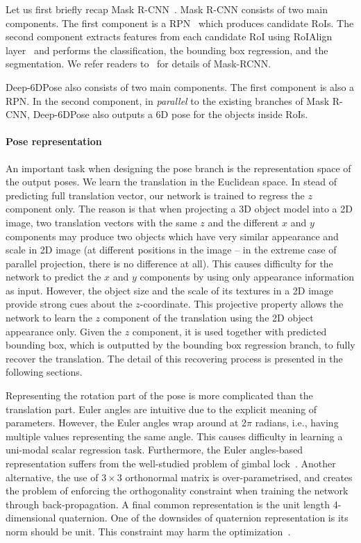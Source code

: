 \documentclass[conference]{IEEEtran}
\newcommand{\method}[1]{Deep-6DPose}
\begin{document}
Let us first briefly recap Mask R-CNN~\cite{Mask-RCNN}. Mask R-CNN consists of two main components. The first component is a RPN~\cite{Faster-RCNN} which produces candidate RoIs. The second component extracts features from each candidate RoI using RoIAlign layer~\cite{Mask-RCNN} and performs the classification, the bounding box regression, and the segmentation. We refer readers to~\cite{Mask-RCNN} for details of Mask-RCNN. 

\method{} also consists of two main components. The first component is also a RPN. In the second component, in \textit{parallel} to the existing branches of Mask R-CNN, \method{} also outputs a 6D pose for the objects inside RoIs. 

\paragraph{Pose representation}
An important task when designing the pose branch is the representation space of the output poses. We learn the translation in the Euclidean space. In stead of predicting full translation vector, our network is trained to regress the $z$ component only. The reason is that when projecting a 3D object model into a 2D image, two translation vectors with the same $z$ and the different $x$ and $y$ components may produce two objects which have very similar appearance and scale in 2D image (at different positions in the image -- in the extreme case of parallel projection, there is no difference at all). This causes difficulty for the network to predict the $x$ and $y$ components by using only appearance information as input. However, the object size and the scale of its textures in a 2D image provide strong cues about the $z$-coordinate. 
This projective property allows the network to learn the $z$ component of the translation using the 2D object appearance only. Given the $z$ component, it is used together with predicted bounding box, which is outputted by the bounding box regression branch, to fully recover the translation. 
The detail of this recovering process is presented in the following sections.  

Representing the rotation part of the pose is more complicated than the translation part. Euler angles are intuitive due to the explicit meaning of parameters. %
However, the Euler angles wrap around at 2$\pi$ radians, i.e., having multiple values representing the same angle. This causes difficulty in learning a uni-modal scalar regression task.  
Furthermore, the Euler angles-based representation suffers from the well-studied problem of gimbal lock~\cite{pose}. Another alternative, the use of $3\times3$ orthonormal matrix is over-parametrised, and creates the problem of enforcing the orthogonality constraint when training the network through back-propagation. A final common representation is the unit length 4-dimensional quaternion. 
One of the downsides of quaternion representation is its norm should be unit. This constraint may harm the optimization~\cite{DBLP:conf/iccv/KendallGC15}. 
 
\end{document}
